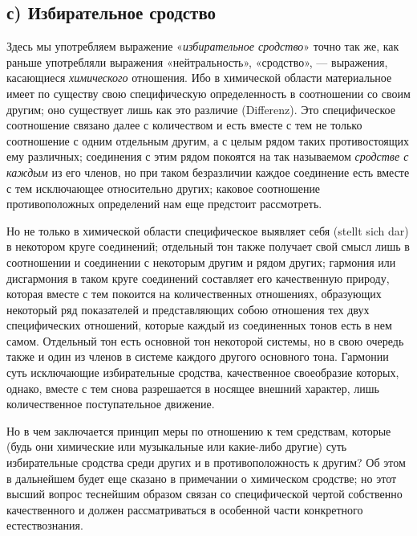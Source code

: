 \subsection[с) Избирательное сродство]{с) Избирательное сродство}
Здесь мы употребляем выражение
«{\em избирательное сродство}» точно так же, как раньше
употребляли выражения «нейтральность», «сродство», — выражения, касающиеся
{\em химического} отношения. Ибо в химической области
материальное имеет по существу свою специфическую определенность в
соотношении со своим другим; оно существует лишь как это различие
(Differenz). Это специфическое соотношение связано далее с количеством и
есть вместе с тем не только соотношение с одним отдельным другим, а с целым
рядом таких противостоящих ему различных; соединения с этим рядом покоятся
на так называемом {\em сродстве с каждым} из его
членов, но при таком безразличии каждое соединение есть вместе с тем
исключающее относительно других; каковое соотношение противоположных
определений нам еще предстоит рассмотреть.

Но не только в химической области специфическое выявляет себя (stellt sich
dar) в некотором круге соединений; отдельный тон также получает свой смысл
лишь в соотношении и соединении с некоторым другим и рядом других; гармония
или дисгармония в таком круге соединений составляет его качественную
природу, которая вместе с тем покоится на количественных отношениях,
образующих некоторый ряд показателей и представляющих собою отношения тех
двух специфических отношений, которые каждый из соединенных тонов есть в
нем самом. Отдельный тон есть основной тон некоторой системы, но в свою
очередь также и один из членов в системе каждого другого основного тона.
Гармонии суть исключающие избирательные сродства, качественное своеобразие
которых, однако, вместе с тем снова разрешается в носящее внешний характер,
лишь количественное поступательное движение.

Но в чем заключается принцип меры по отношению к тем средствам, которые
(будь они химические или музыкальные или какие-либо другие) суть
избирательные сродства среди других и в противоположность к другим? Об этом
в дальнейшем будет еще сказано в примечании о химическом сродстве; но этот
высший вопрос теснейшим образом связан со специфической чертой собственно
качественного и должен рассматриваться в особенной части конкретного
естествознания.

